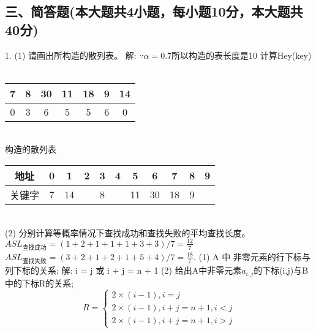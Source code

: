 \subsection{三、简答题(本大题共4小题，每小题10分，本大题共40分)}
1. \newline
(1) 请画出所构造的散列表。\newline
解:\newline
$\because \alpha = 0.7 所以构造的表长度是 10$\newline
计算Hey(key)\newline
~\\
\begin{center}
\begin{tabular}{|c|c|c|c|c|c|c|}%
	\hline  %
	7 & 8 & 30 & 11 & 18 & 9 & 14 \\
	\hline  %
	0 & 3 & 6  & 5  & 5  & 6 & 0 \\
	\hline %
\end{tabular}
\end{center}
~\\
构造的散列表\newline
~\\
\begin{center}
\begin{tabular}{|c|c|c|c|c|c|c|c|c|c|c|}%
	\hline  %
	地址   & 0 & 1 & 2 & 3 & 4 & 5  & 6 & 7 & 8 & 9\\
	\hline  %
	关键字 & 7 & 14&   & 8 &   & 11 & 30& 18& 9 &  \\
	\hline %
\end{tabular}
\end{center}
~\\
(2) 分别计算等概率情况下查找成功和查找失败的平均查找长度。\newline
$ASL_{\mbox{查找成功}} = (1 + 2 + 1 + 1 + 1 + 3 + 3) / 7 = \frac{12}{7}$\newline
$ASL_{\mbox{查找失败}} = (3 + 2 + 1 + 2 + 1 + 5 + 4) / 7 = \frac{18}{7}$. \newline
(1) A 中 非零元素的行下标与列下标的关系;\newline
解:\newline
i = j 或 i + j = n + 1\newline
(2) 给出A中非零元素$a_{i,j}$的下标(i,j)与B中的下标R的关系;\newline
\begin{equation}
R=\left\{
\begin{aligned}
2 \times (i - 1), i = j\\
2 \times (i - 1), i+j = n+1, i < j \\
2 \times (i - 1), i+j = n+1, i > j
\end{aligned}
\right.
\end{equation}
